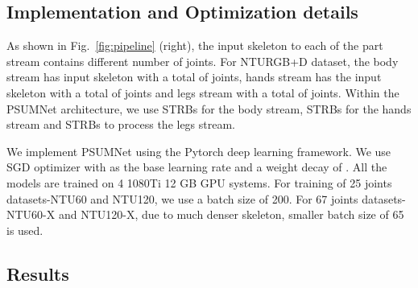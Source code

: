 \documentclass[runningheads]{llncs}
\begin{document}
\subsection{Implementation and Optimization details}

As shown in Fig.~\ref{fig:pipeline} (right), the input skeleton to each of the part stream contains different number of joints. For NTURGB+D dataset, the body stream has input skeleton with a total of  joints, hands stream has the input skeleton with a total of  joints and legs stream with a total of  joints. Within the PSUMNet architecture, we use  STRBs for the body stream,  STRBs for the hands stream and  STRBs to process the legs stream.

We implement PSUMNet using the Pytorch deep learning framework. We use SGD optimizer with  as the base learning rate and a weight decay of . All the models are trained on 4 1080Ti 12 GB GPU systems. For training of 25 joints datasets-NTU60 and NTU120, we use a batch size of 200. For 67 joints datasets-NTU60-X and NTU120-X, due to much denser skeleton, smaller batch size of 65 is used. 


\subsection{Results}
\label{sec:results}
\end{document}
